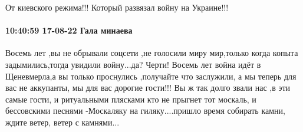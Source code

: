 От киевского режима!!! Который развязал войну на Украине!!!

\paragraph{10:40:59 17-08-22 Гала минаева}

Восемь лет ,вы не обрывали соцсети ,не голосили миру мир,только когда копыта
задымились,тогда увидили войну...да? Черти! Восемь лет война идёт в
Щеневмерла,а вы только проснулись ,получайте что заслужили, а мы теперь для вас
не аккупанты, мы для вас дорогие гости!!! Вы ж так долго звали нас ,в эти самые
гости, и ритуальными плясками кто не прыгнет тот москаль, и бессовскими песнями
-Москаляку на гиляку....пришло время собирать камни, ждите ветер, ветер с
камнями...
